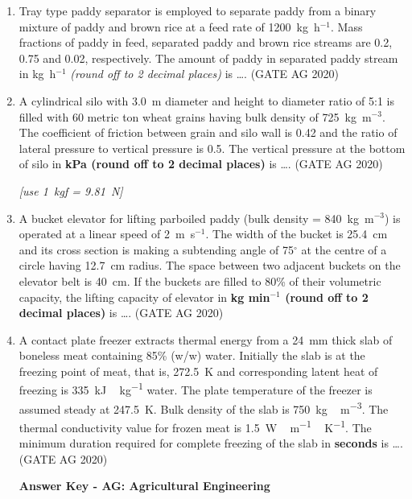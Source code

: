 \documentclass[journal]{IEEEtran}
\begin{document}
\begin{enumerate}
\medskip




\medskip


 \item 
 Tray type paddy separator is employed to separate paddy from a binary mixture of paddy and brown rice at a feed rate of 1200~kg~h$^{-1}$. Mass fractions of paddy in feed, separated paddy and brown rice streams are 0.2, 0.75 and 0.02, respectively. The amount of paddy in separated paddy stream in kg~h$^{-1}$ \emph{(round off to 2 decimal places)} is \dots.
 \hfill(GATE AG 2020)\\

 \medskip

\item 
 A cylindrical silo with 3.0~m diameter and height to diameter ratio of 5:1 is filled with 60 metric ton wheat grains having bulk density of 725~kg~m$^{-3}$. The coefficient of friction between grain and silo wall is 0.42 and the ratio of lateral pressure to vertical pressure is 0.5. The vertical pressure at the bottom of silo in \textbf{kPa (round off to 2 decimal places)} is \dots.
 \hfill(GATE AG 2020)\\

 \medskip
    
    \textit{[use 1~kgf = 9.81~N]}

 \item 
 A bucket elevator for lifting parboiled paddy (bulk density = 840~kg~m$^{-3}$) is operated at a linear speed of 2~m~s$^{-1}$. The width of the bucket is 25.4~cm and its cross section is making a subtending angle of 75$^\circ$ at the centre of a circle having 12.7~cm radius. The space between two adjacent buckets on the elevator belt is 40~cm. If the buckets are filled to 80\% of their volumetric capacity, the lifting capacity of elevator in \textbf{kg min$^{-1}$ (round off to 2 decimal places)} is \dots.
 \hfill(GATE AG 2020)\\

\medskip

\item
A contact plate freezer extracts thermal energy from a \SI{24}{mm} thick slab of boneless meat containing 85\% (w/w) water. Initially the slab is at the freezing point of meat, that is, \SI{272.5}{K} and corresponding latent heat of freezing is \SI{335}{kJ\,kg^{-1}} water. The plate temperature of the freezer is assumed steady at \SI{247.5}{K}. Bulk density of the slab is \SI{750}{kg\,m^{-3}}. The thermal conductivity value for frozen meat is \SI{1.5}{W\,m^{-1}\,K^{-1}}. The minimum duration required for complete freezing of the slab in \textbf{seconds} is \dots.
\hfill(GATE AG 2020)\\

\medskip

\begin{center}
\textbf{Answer Key - AG: Agricultural Engineering}
\end{center}

\end{enumerate}
\end{document}
